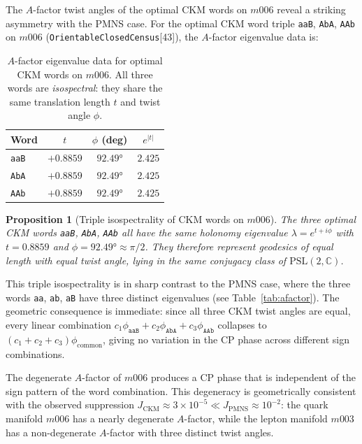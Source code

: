 \documentclass[floatfix,aps,prd,twocolumn,showpacs,superscriptaddress,longbibliography]{revtex4-2}
\newtheorem{proposition}{Proposition}
\newcommand{\PSL}{\mathrm{PSL}(2,\mathbb{C})}
\begin{document}
The $A$-factor twist angles of the optimal CKM words on $m006$
reveal a striking asymmetry with the PMNS case.
For the optimal CKM word triple \texttt{aaB}, \texttt{AbA}, \texttt{AAb}
on $m006$ (\texttt{OrientableClosedCensus}[43]), the $A$-factor
eigenvalue data is:

\begin{table}[h]
\centering
\caption{$A$-factor eigenvalue data for optimal CKM words on $m006$.
All three words are \emph{isospectral}: they share the same translation
length $t$ and twist angle $\phi$.}
\label{tab:ckm_afactor}
\begin{tabular}{lccc}
\toprule
Word & $t$ & $\phi$ (deg) & $e^{|t|}$ \\
\midrule
\texttt{aaB} & $+0.8859$ & $92.49°$ & $2.425$ \\
\texttt{AbA} & $+0.8859$ & $92.49°$ & $2.425$ \\
\texttt{AAb} & $+0.8859$ & $92.49°$ & $2.425$ \\
\bottomrule
\end{tabular}
\end{table}

\begin{proposition}[Triple isospectrality of CKM words on $m006$]
\label{prop:ckm_isospectral}
The three optimal CKM words \texttt{aaB}, \texttt{AbA}, \texttt{AAb}
all have the same holonomy eigenvalue $\lambda = e^{t+i\phi}$ with
$t = 0.8859$ and $\phi = 92.49° \approx \pi/2$.
They therefore represent geodesics of equal length with equal twist
angle, lying in the same conjugacy class of $\PSL$.
\end{proposition}

This triple isospectrality is in sharp contrast to the PMNS case,
where the three words \texttt{aa}, \texttt{ab}, \texttt{aB} have
three distinct eigenvalues (see Table~\ref{tab:afactor}).
The geometric consequence is immediate: since all three CKM twist
angles are equal, every linear combination
$c_1\phi_{\texttt{aaB}} + c_2\phi_{\texttt{AbA}} + c_3\phi_{\texttt{AAb}}$
collapses to $(c_1+c_2+c_3)\phi_{\mathrm{common}}$, giving no
variation in the CP phase across different sign combinations.

\begin{corollary}
\label{cor:ckm_suppression}
The degenerate $A$-factor of $m006$ produces a CP phase that is
independent of the sign pattern of the word combination.
This degeneracy is geometrically consistent with the observed
suppression $J_{\mathrm{CKM}} \approx 3\times10^{-5} \ll
J_{\mathrm{PMNS}} \approx 10^{-2}$: the quark manifold $m006$
has a nearly degenerate $A$-factor, while the lepton manifold
$m003$ has a non-degenerate $A$-factor with three distinct
twist angles.
\end{corollary}
\end{document}
